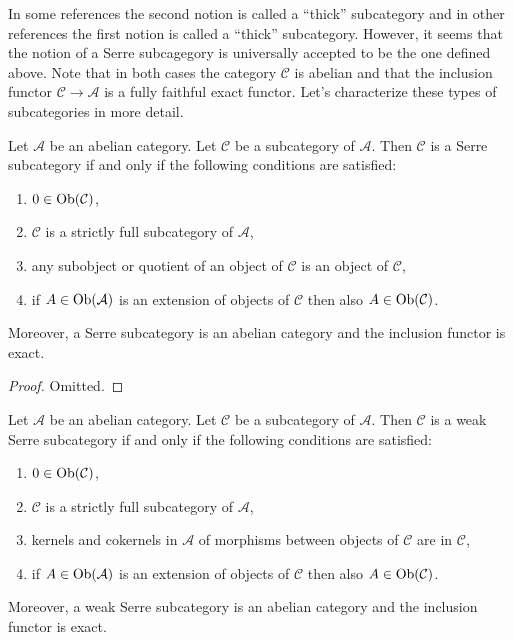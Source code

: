 \noindent
In some references the second notion is called a ``thick'' subcategory
and in other references the first notion is called a ``thick'' subcategory.
However, it seems that the notion of a Serre subcagegory is universally
accepted to be the one defined above. Note that in both cases the category
$\mathcal{C}$ is abelian and that the inclusion functor
$\mathcal{C} \to \mathcal{A}$ is a fully faithful exact functor.
Let's characterize these types of subcategories in more detail.

\begin{lemma}
\label{lemma-characterize-serre-subcategory}
Let $\mathcal{A}$ be an abelian category.
Let $\mathcal{C}$ be a subcategory of $\mathcal{A}$.
Then $\mathcal{C}$ is a Serre subcategory if and only if
the following conditions are satisfied:
\begin{enumerate}
\item $0 \in \mathop{\rm Ob}\nolimits(\mathcal{C})$,
\item $\mathcal{C}$ is a strictly full subcategory of $\mathcal{A}$,
\item any subobject or quotient of an object of $\mathcal{C}$ is an object
of $\mathcal{C}$,
\item if $A \in \mathop{\rm Ob}\nolimits(\mathcal{A})$ is an extension of objects of $\mathcal{C}$
then also $A \in \mathop{\rm Ob}\nolimits(\mathcal{C})$.
\end{enumerate}
Moreover, a Serre subcategory is an abelian category and
the inclusion functor is exact.
\end{lemma}

\begin{proof}
Omitted.
\end{proof}

\begin{lemma}
\label{lemma-characterize-weak-serre-subcategory}
Let $\mathcal{A}$ be an abelian category.
Let $\mathcal{C}$ be a subcategory of $\mathcal{A}$.
Then $\mathcal{C}$ is a weak Serre subcategory if and only if
the following conditions are satisfied:
\begin{enumerate}
\item $0 \in \mathop{\rm Ob}\nolimits(\mathcal{C})$,
\item $\mathcal{C}$ is a strictly full subcategory of $\mathcal{A}$,
\item kernels and cokernels in $\mathcal{A}$ of morphisms
between objects of $\mathcal{C}$ are in $\mathcal{C}$,
\item if $A \in \mathop{\rm Ob}\nolimits(\mathcal{A})$ is an extension of objects of $\mathcal{C}$
then also $A \in \mathop{\rm Ob}\nolimits(\mathcal{C})$.
\end{enumerate}
Moreover, a weak Serre subcategory is an abelian category and
the inclusion functor is exact.
\end{lemma}

